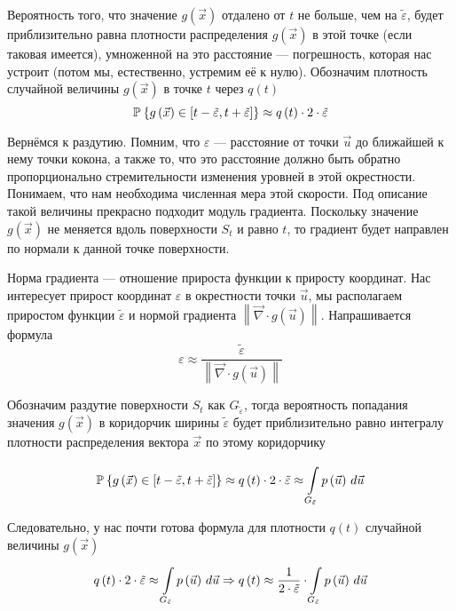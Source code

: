 Вероятность того, что значение $g\left( \vec{x} \right)$
отдалено от $t$ не больше, чем на $\tilde{\varepsilon}$,
будет приблизительно равна плотности распределения $g\left( \vec{x} \right)$
в этой точке (если таковая имеется),
умноженной на это расстояние --- погрешность,
которая нас устроит (потом мы, естественно, устремим её к нулю).
Обозначим плотность случайной величины $g\left( \vec{x} \right)$
в точке $t$ через $q\left( t \right)$
$$\Probability{g\left( \vec{x} \right)
  \in \left[t-\tilde{\varepsilon}, t+ \tilde{\varepsilon}\right]}
  \approx q\left( t \right) \cdot 2 \cdot \tilde{\varepsilon}$$

Вернёмся к раздутию. Помним, что $\varepsilon$ --- расстояние от
точки $\vec{u}$ до ближайшей к нему точки кокона, а также то,
что это расстояние должно быть обратно пропорционально
стремительности изменения уровней в этой окрестности.
Понимаем, что нам необходима численная мера этой скорости.
Под описание такой величины прекрасно подходит модуль градиента.
Поскольку значение $g\left( \vec{x} \right)$ не меняется вдоль поверхности $S_t$
и равно $t$, то градиент будет направлен по нормали к данной точке поверхности.

Норма градиента --- отношение прироста функции к приросту координат.
Нас интересует прирост координат $\varepsilon$ в окрестности точки $\vec{u}$,
мы располагаем приростом функции $\tilde{\varepsilon}$
и нормой градиента
$\left\| \vec{\nabla} \cdot {g\left( \vec{u} \right)} \right\|$.
Напрашивается формула
\begin{equation}\label{widthEpsilon}
  \varepsilon \approx \frac{\tilde{\varepsilon}}
      {\left\| \vec{\nabla} \cdot g\left( \vec{u} \right) \right\|}
\end{equation}

Обозначим раздутие поверхности $S_t$ как $G_{\tilde{\varepsilon}}$,
тогда вероятность попадания значения $g\left( \vec{x} \right)$ в коридорчик
ширины $\tilde{\varepsilon}$ будет приблизительно равно интегралу
плотности распределения вектора $\vec{x}$ по этому коридорчику

$$\Probability{g\left( \vec{x} \right)
  \in \left[t-\tilde{\varepsilon}, t+ \tilde{\varepsilon}\right]}
  \approx q\left( t \right) \cdot 2 \cdot \tilde{\varepsilon}
  \approx \integrall{G_{\tilde{\varepsilon}}}{d\vec{u}}{\pdf{\vec{u}}}$$

Следовательно, у нас почти готова формула для плотности $q\left( t \right)$
случайной величины $g\left( \vec{x} \right)$
$$q\left( t \right) \cdot 2 \cdot \tilde{\varepsilon}
      \approx \integrall{G_{\tilde{\varepsilon}}}{d\vec{u}}{\pdf{\vec{u}}}
      \Rightarrow q\left( t \right)
      \approx \frac{1}{2 \cdot \tilde{\varepsilon}}
      \cdot \integrall{G_{\tilde{\varepsilon}}}{d\vec{u}}{
    \pdf{\vec{u}}}$$

